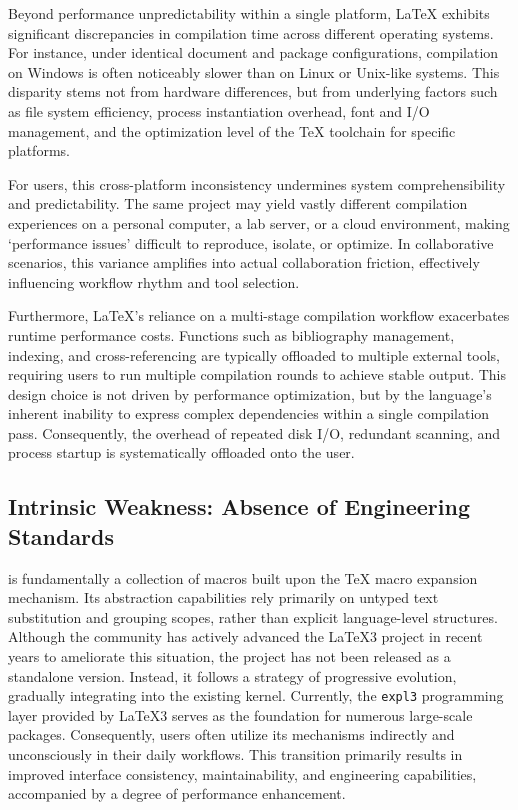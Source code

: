 Beyond performance unpredictability within a single platform, \LaTeX{} exhibits significant discrepancies in compilation time across different operating systems. For instance, under identical document and package configurations, compilation on Windows is often noticeably slower than on Linux or Unix-like systems. This disparity stems not from hardware differences, but from underlying factors such as file system efficiency, process instantiation overhead, font and I/O management, and the optimization level of the \TeX{} toolchain for specific platforms.

For users, this cross-platform inconsistency undermines system comprehensibility and predictability. The same project may yield vastly different compilation experiences on a personal computer, a lab server, or a cloud environment, making `performance issues' difficult to reproduce, isolate, or optimize. In collaborative scenarios, this variance amplifies into actual collaboration friction, effectively influencing workflow rhythm and tool selection.

Furthermore, \LaTeX{}'s reliance on a multi-stage compilation workflow exacerbates runtime performance costs. Functions such as bibliography management, indexing, and cross-referencing are typically offloaded to multiple external tools, requiring users to run multiple compilation rounds to achieve stable output. This design choice is not driven by performance optimization, but by the language's inherent inability to express complex dependencies within a single compilation pass. Consequently, the overhead of repeated disk I/O, redundant scanning, and process startup is systematically offloaded onto the user.

\subsection{Intrinsic Weakness: Absence of Engineering Standards}

\LaTeXe{} is fundamentally a collection of macros built upon the \TeX{} macro expansion mechanism. Its abstraction capabilities rely primarily on untyped text substitution and grouping scopes, rather than explicit language-level structures. Although the community has actively advanced the \LaTeX3 project in recent years to ameliorate this situation, the project has not been released as a standalone version. Instead, it follows a strategy of progressive evolution, gradually integrating into the existing \LaTeXe{} kernel. Currently, the \texttt{expl3} programming layer provided by \LaTeX3 serves as the foundation for numerous large-scale packages. Consequently, users often utilize its mechanisms indirectly and unconsciously in their daily workflows. This transition primarily results in improved interface consistency, maintainability, and engineering capabilities, accompanied by a degree of performance enhancement.

